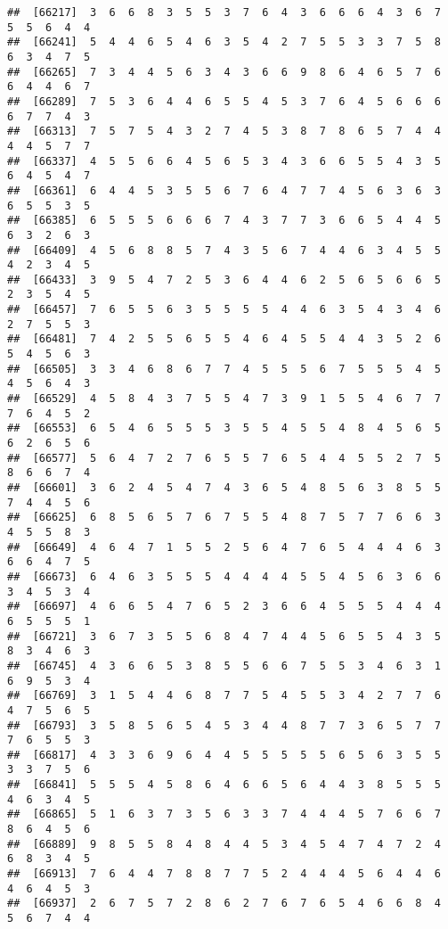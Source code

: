 \documentclass[
]{book}
\begin{document}
\begin{verbatim}
##  [66217]  3  6  6  8  3  5  5  3  7  6  4  3  6  6  6  4  3  6  7  5  5  6  4  4
##  [66241]  5  4  4  6  5  4  6  3  5  4  2  7  5  5  3  3  7  5  8  6  3  4  7  5
##  [66265]  7  3  4  4  5  6  3  4  3  6  6  9  8  6  4  6  5  7  6  6  4  4  6  7
##  [66289]  7  5  3  6  4  4  6  5  5  4  5  3  7  6  4  5  6  6  6  6  7  7  4  3
##  [66313]  7  5  7  5  4  3  2  7  4  5  3  8  7  8  6  5  7  4  4  4  4  5  7  7
##  [66337]  4  5  5  6  6  4  5  6  5  3  4  3  6  6  5  5  4  3  5  6  4  5  4  7
##  [66361]  6  4  4  5  3  5  5  6  7  6  4  7  7  4  5  6  3  6  3  6  5  5  3  5
##  [66385]  6  5  5  5  6  6  6  7  4  3  7  7  3  6  6  5  4  4  5  6  3  2  6  3
##  [66409]  4  5  6  8  8  5  7  4  3  5  6  7  4  4  6  3  4  5  5  4  2  3  4  5
##  [66433]  3  9  5  4  7  2  5  3  6  4  4  6  2  5  6  5  6  6  5  2  3  5  4  5
##  [66457]  7  6  5  5  6  3  5  5  5  5  4  4  6  3  5  4  3  4  6  2  7  5  5  3
##  [66481]  7  4  2  5  5  6  5  5  4  6  4  5  5  4  4  3  5  2  6  5  4  5  6  3
##  [66505]  3  3  4  6  8  6  7  7  4  5  5  5  6  7  5  5  5  4  5  4  5  6  4  3
##  [66529]  4  5  8  4  3  7  5  5  4  7  3  9  1  5  5  4  6  7  7  7  6  4  5  2
##  [66553]  6  5  4  6  5  5  5  3  5  5  4  5  5  4  8  4  5  6  5  6  2  6  5  6
##  [66577]  5  6  4  7  2  7  6  5  5  7  6  5  4  4  5  5  2  7  5  8  6  6  7  4
##  [66601]  3  6  2  4  5  4  7  4  3  6  5  4  8  5  6  3  8  5  5  7  4  4  5  6
##  [66625]  6  8  5  6  5  7  6  7  5  5  4  8  7  5  7  7  6  6  3  4  5  5  8  3
##  [66649]  4  6  4  7  1  5  5  2  5  6  4  7  6  5  4  4  4  6  3  6  6  4  7  5
##  [66673]  6  4  6  3  5  5  5  4  4  4  4  5  5  4  5  6  3  6  6  3  4  5  3  4
##  [66697]  4  6  6  5  4  7  6  5  2  3  6  6  4  5  5  5  4  4  4  6  5  5  5  1
##  [66721]  3  6  7  3  5  5  6  8  4  7  4  4  5  6  5  5  4  3  5  8  3  4  6  3
##  [66745]  4  3  6  6  5  3  8  5  5  6  6  7  5  5  3  4  6  3  1  6  9  5  3  4
##  [66769]  3  1  5  4  4  6  8  7  7  5  4  5  5  3  4  2  7  7  6  4  7  5  6  5
##  [66793]  3  5  8  5  6  5  4  5  3  4  4  8  7  7  3  6  5  7  7  7  6  5  5  3
##  [66817]  4  3  3  6  9  6  4  4  5  5  5  5  5  6  5  6  3  5  5  3  3  7  5  6
##  [66841]  5  5  5  4  5  8  6  4  6  6  5  6  4  4  3  8  5  5  5  4  6  3  4  5
##  [66865]  5  1  6  3  7  3  5  6  3  3  7  4  4  4  5  7  6  6  7  8  6  4  5  6
##  [66889]  9  8  5  5  8  4  8  4  4  5  3  4  5  4  7  4  7  2  4  6  8  3  4  5
##  [66913]  7  6  4  4  7  8  8  7  7  5  2  4  4  4  5  6  4  4  6  4  6  4  5  3
##  [66937]  2  6  7  5  7  2  8  6  2  7  6  7  6  5  4  6  6  8  4  5  6  7  4  4

\end{verbatim}
\end{document}
